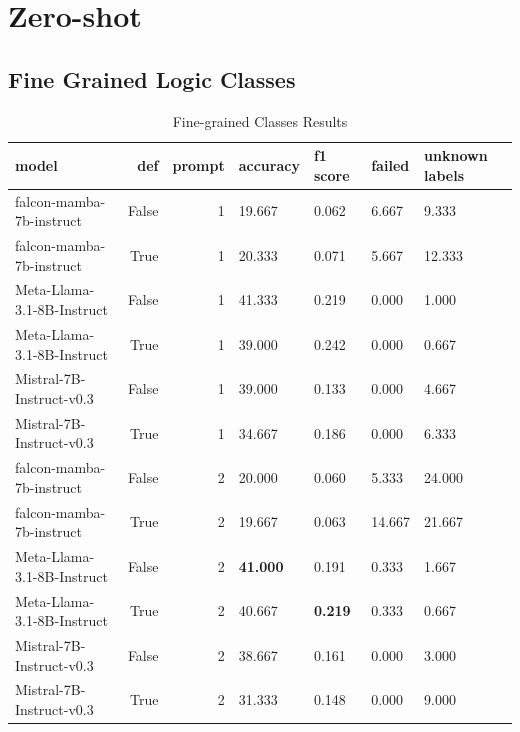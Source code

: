 \section{Zero-shot}


\subsection{ Fine Grained Logic Classes}
\begin{table}[H]
\centering
\caption{Fine-grained Classes Results}
\begin{tabular}{lrrllll}
\toprule
model & def & prompt & accuracy & f1 score & failed & unknown labels \\
\midrule
falcon-mamba-7b-instruct & False & 1 & 19.667 & 0.062 & 6.667 & 9.333 \\
falcon-mamba-7b-instruct & True & 1 & 20.333 & 0.071 & 5.667 & 12.333 \\
Meta-Llama-3.1-8B-Instruct & False & 1 & 41.333 & 0.219 & 0.000 & 1.000 \\
Meta-Llama-3.1-8B-Instruct & True & 1 & 39.000 & 0.242 & 0.000 & 0.667 \\
Mistral-7B-Instruct-v0.3 & False & 1 & 39.000 & 0.133 & 0.000 & 4.667 \\
Mistral-7B-Instruct-v0.3 & True & 1 & 34.667 & 0.186 & 0.000 & 6.333 \\
falcon-mamba-7b-instruct & False & 2 & 20.000 & 0.060 & 5.333 & 24.000 \\
falcon-mamba-7b-instruct & True & 2 & 19.667 & 0.063 & 14.667 & 21.667 \\
Meta-Llama-3.1-8B-Instruct & False & 2 & \textbf{41.000} & 0.191 & 0.333 & 1.667 \\
Meta-Llama-3.1-8B-Instruct & True & 2 & 40.667 & \textbf{0.219} & 0.333 & 0.667 \\
Mistral-7B-Instruct-v0.3 & False & 2 & 38.667 & 0.161 & 0.000 & 3.000 \\
Mistral-7B-Instruct-v0.3 & True & 2 & 31.333 & 0.148 & 0.000 & 9.000 \\
\bottomrule
\end{tabular}
\end{table}

